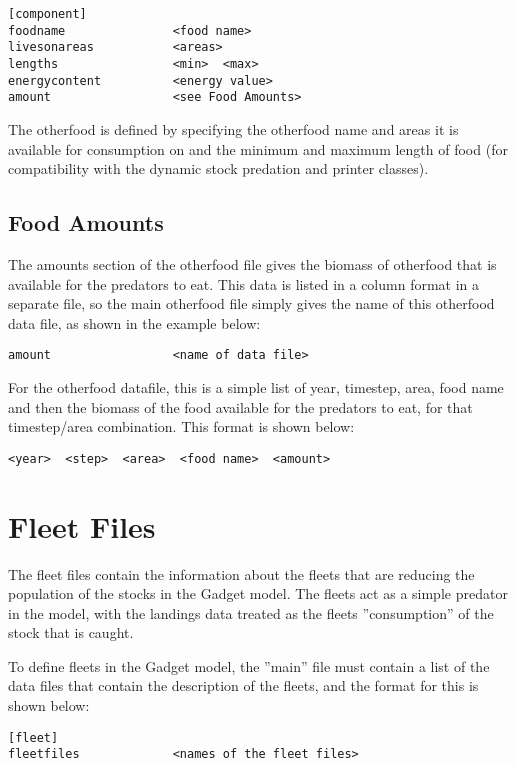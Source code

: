 \documentclass[10pt,twoside]{book}
\begin{document}
{\small\begin{verbatim}
[component]
foodname               <food name>
livesonareas           <areas>
lengths                <min>  <max>
energycontent          <energy value>
amount                 <see Food Amounts>
\end{verbatim}}

The otherfood is defined by specifying the otherfood name and areas it is available for consumption on and the minimum and maximum length of food (for compatibility with the dynamic stock predation and printer classes).

\section{Food Amounts}\label{sec:foodamounts}
The amounts section of the otherfood file gives the biomass of otherfood that is available for the predators to eat.  This data is listed in a column format in a separate file, so the main otherfood file simply gives the name of this otherfood data file, as shown in the example below:

{\small\begin{verbatim}
amount                 <name of data file>
\end{verbatim}}

For the otherfood datafile, this is a simple list of year, timestep, area, food name and then the biomass of the food available for the predators to eat, for that timestep/area combination.  This format is shown below:

{\small\begin{verbatim}
<year>  <step>  <area>  <food name>  <amount>
\end{verbatim}}

\chapter{Fleet Files}\label{chap:fleet}
The fleet files contain the information about the fleets that are reducing the population of the stocks in the Gadget model.  The fleets act as a simple predator in the model, with the landings data treated as the fleets ''consumption'' of the stock that is caught.

\bigskip
To define fleets in the Gadget model, the ''main'' file must contain a list of the data files that contain the description of the fleets, and the format for this is shown below:

{\small\begin{verbatim}
[fleet]
fleetfiles             <names of the fleet files>
\end{verbatim}}
\end{document}
